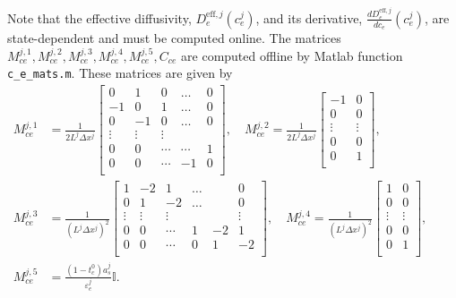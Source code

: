 \documentclass[12pt]{article}
\newcommand{\eff}{\text{eff}}
\begin{document}
Note that the effective diffusivity, $D_e^{\eff,j}(c_e^j)$, and its derivative, $\frac{d D_e^{\eff,j}}{d c_e}(c_e^j)$, are state-dependent and must be computed online. The matrices $M^{j,1}_{ce}, M^{j,2}_{ce}, M^{j,3}_{ce}, M^{j,4}_{ce}, M^{j,5}_{ce}, C_{ce}$ are computed offline by Matlab function \texttt{c\_e\_mats.m}. These matrices are given by
\begin{align}
M^{j,1}_{ce} &=
\frac{1}{2 L^j \Delta x^j} \left[
\begin{array}{ccccc}
 0 & 1 & 0 & \ldots & 0  \\
 -1 & 0 & 1 & \ldots & 0  \\
 0 & -1 & 0 & \ldots & 0  \\
 \vdots & \vdots & \vdots &  &  \\
 0 & 0 & \cdots & \cdots & 1 \\
 0 & 0 & \cdots & -1 & 0 \\
\end{array}
\right], \quad
M^{j,2}_{ce} =
\frac{1}{2 L^j \Delta x^j} \left[
\begin{array}{cc}
 -1 & 0  \\
 0 & 0 \\
 \vdots & \vdots  \\
 0 & 0 \\
 0 & 1 \\
\end{array}
\right], \qquad \\
M^{j,3}_{ce} &= \frac{1}{(L^j \Delta x^j)^2}
\left[
\begin{array}{cccccc}
 1 & -2 & 1 & \ldots & & 0  \\
 0 & 1 & -2 & \ldots & & 0  \\
 \vdots & \vdots & \vdots & & & \vdots \\
 0 & 0 & \cdots & 1 & -2 & 1 \\
 0 & 0 & \cdots & 0 & 1 & -2 \\
\end{array}
\right], \quad
M^{j,4}_{ce} =
\frac{1}{(L^j \Delta x^j)^2} \left[
\begin{array}{cc}
 1 & 0  \\
 0 & 0 \\
 \vdots & \vdots  \\
 0 & 0 \\
 0 & 1 \\
\end{array}
\right], \qquad \\
M^{j,5}_{ce} &= \frac{(1-t_c^0)a_s^j}{\varepsilon_e^j}
\mathbb{I}.
\end{align}
\end{document}
